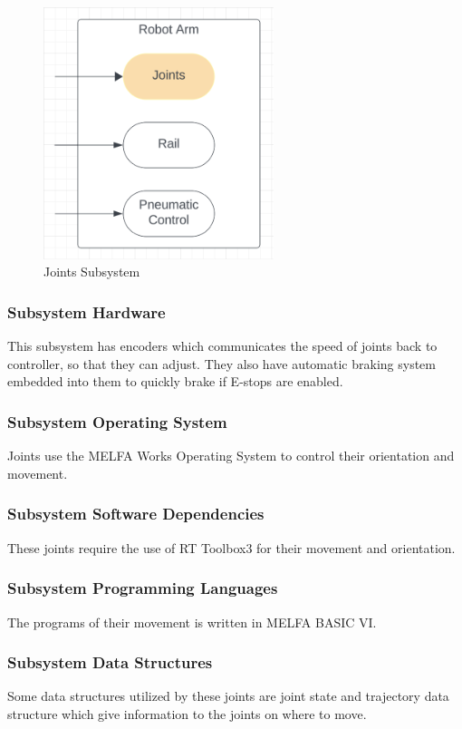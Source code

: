 \begin{figure}[h!]
	\centering
 	\includegraphics[width=0.60\textwidth]{images/joints.png}
 \caption{Joints Subsystem}
\end{figure}

\subsubsection{Subsystem Hardware}
This subsystem has encoders which communicates the speed of joints back to controller, so that they can adjust. They also have automatic braking system embedded into them to quickly brake if E-stops are enabled. 

\subsubsection{Subsystem Operating System}
Joints use the MELFA Works Operating System to control their orientation and movement.

\subsubsection{Subsystem Software Dependencies}
These joints require the use of RT Toolbox3 for their movement and orientation.

\subsubsection{Subsystem Programming Languages}
The programs of their movement is written in MELFA BASIC VI.

\subsubsection{Subsystem Data Structures}
Some data structures utilized by these joints are joint state and trajectory data structure which give information to the joints on where to move.


